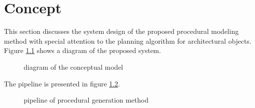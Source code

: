 
\chapter{Concept}
\label{sec:concept}


This section discusses the system design of the proposed procedural modeling method with special attention to the planning algorithm for architectural objects. Figure \ref{fig:conceptualmodel} shows a diagram of the proposed system.

\begin{figure}[htbp]
	\centering
	\caption{diagram of the conceptual model}
	\label{fig:conceptualmodel}
\end{figure}

The pipeline is presented in figure \ref{fig:pipeline}.

\begin{figure}[htbp]
	\centering
	\caption{pipeline of procedural generation method}
	\label{fig:pipeline}
\end{figure}

